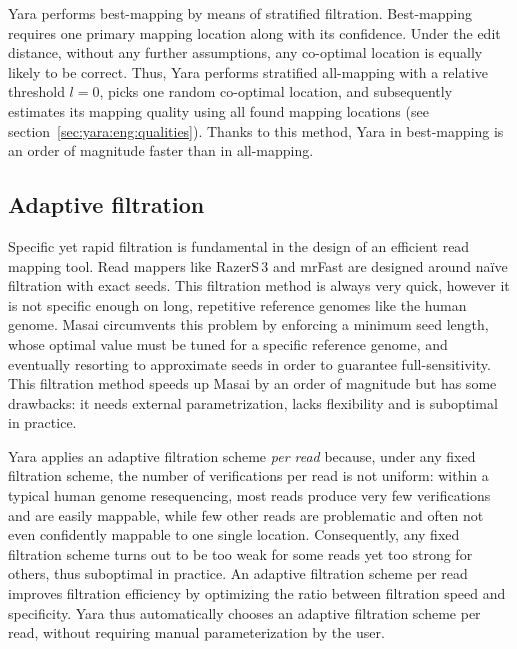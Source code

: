 Yara performs best-mapping by means of stratified filtration.
Best-mapping requires one primary mapping location along with its confidence.
Under the edit distance, without any further assumptions, any co-optimal location is equally likely to be correct.
Thus, Yara performs stratified all-mapping with a relative threshold $l=0$, picks one random co-optimal location, and subsequently estimates its mapping quality using all found mapping locations (see section~\ref{sec:yara:eng:qualities}).
Thanks to this method, Yara in best-mapping is an order of magnitude faster than in all-mapping.


\subsection{Adaptive filtration}
\label{sec:yara:eng:adaptive}

Specific yet rapid filtration is fundamental in the design of an efficient read mapping tool.
Read mappers like RazerS\,3 \citep{Weese2012} and mrFast \citep{Ahmadi2012} are designed around na\"ive filtration with exact seeds.
This filtration method is always very quick, however it is not specific enough on long, repetitive reference genomes like the human genome.
Masai \citep{Siragusa2013} circumvents this problem by enforcing a minimum seed length,
whose optimal value must be tuned for a specific reference genome, and eventually resorting to approximate seeds in order to guarantee full-sensitivity.
This filtration method speeds up Masai by an order of magnitude but has some drawbacks:
it needs external parametrization, lacks flexibility and is suboptimal in practice.

Yara applies an adaptive filtration scheme \emph{per read} because, under any fixed filtration scheme, the number of verifications per read is not uniform: within a typical human genome resequencing, most reads produce very few verifications and are easily mappable, while few other reads are problematic and often not even confidently mappable to one single location.
Consequently, any fixed filtration scheme turns out to be too weak for some reads yet too strong for others, thus suboptimal in practice.
An adaptive filtration scheme per read improves filtration efficiency by optimizing the ratio between filtration speed and specificity.
Yara thus automatically chooses an adaptive filtration scheme per read, without requiring manual parameterization by the user.

